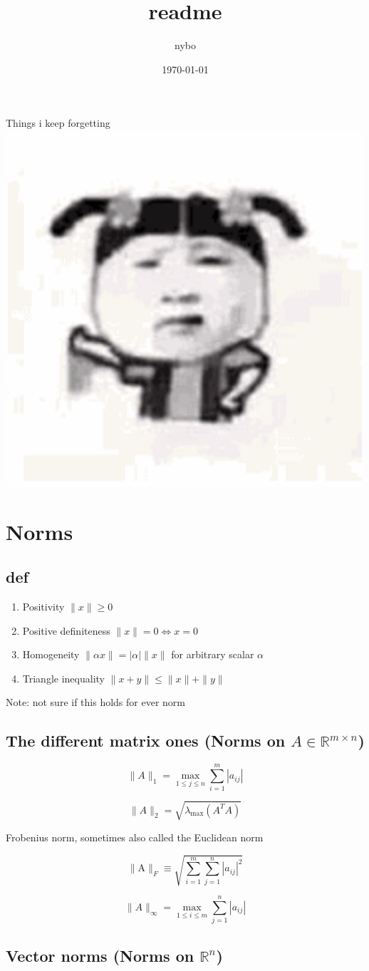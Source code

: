 \documentclass[a4paper]{article}
\author{nybo}
\date{\today}
\title{readme}
\begin{document}
\maketitle
\tableofcontents

Things i keep forgetting
\includegraphics[height=0.2\textwidth]{./imgs/5332.png}

\section{Norms}
\label{sec-1}
\subsection*{def}
\label{sec-1-1}
\begin{enumerate}
\item Positivity  $\|x\| \geq 0$
\item Positive definiteness $\|x\|=0 \Longleftrightarrow x=0$
\item Homogeneity $\|\alpha x\|=|\alpha|\|x\|$ for arbitrary scalar $\alpha$
\item Triangle inequality $\|x+y\| \leq\|x\|+\|y\|$
\end{enumerate}
Note: not sure if this holds for ever norm
\subsection*{The different matrix ones (Norms on $A \in \mathbb{R}^{m \times n}$)}
\label{sec-1-2}
$$
\|A\|_{1}=\max _{1 \leq j \leq n} \sum_{i=1}^{m}\left|a_{i j}\right|
$$

$$
\|A\|_{2}=\sqrt{\lambda_{\max }\left(A^{T} A\right)}
$$

Frobenius norm, sometimes also called the Euclidean norm

$$
\|\mathrm{A}\|_{F} \equiv \sqrt{\sum_{i=1}^{m} \sum_{j=1}^{n}\left|a_{i j}\right|^{2}}
$$

$$
\|A\|_{\infty}=\max _{1 \leq i \leq m} \sum_{j=1}^{n}\left|a_{i j}\right|
$$
\subsection*{Vector norms (Norms on $\mathbb{R}^{n}$)}
\label{sec-1-3}
\end{document}

